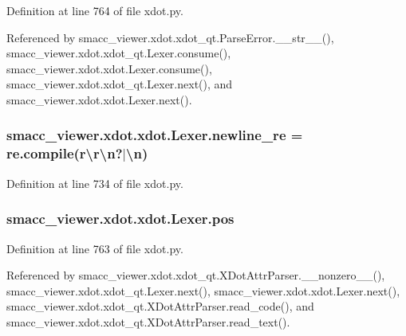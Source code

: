 Definition at line 764 of file xdot.\+py.



Referenced by smacc\+\_\+viewer.\+xdot.\+xdot\+\_\+qt.\+Parse\+Error.\+\_\+\+\_\+str\+\_\+\+\_\+(), smacc\+\_\+viewer.\+xdot.\+xdot\+\_\+qt.\+Lexer.\+consume(), smacc\+\_\+viewer.\+xdot.\+xdot.\+Lexer.\+consume(), smacc\+\_\+viewer.\+xdot.\+xdot\+\_\+qt.\+Lexer.\+next(), and smacc\+\_\+viewer.\+xdot.\+xdot.\+Lexer.\+next().

\subsubsection[{\texorpdfstring{newline\+\_\+re}{newline_re}}]{\setlength{\rightskip}{0pt plus 5cm}smacc\+\_\+viewer.\+xdot.\+xdot.\+Lexer.\+newline\+\_\+re = re.\+compile(r\textquotesingle{}\textbackslash{}r\textbackslash{}n?$\vert$\textbackslash{}n\textquotesingle{})\hspace{0.3cm}{\ttfamily [static]}}\hypertarget{classsmacc__viewer_1_1xdot_1_1xdot_1_1Lexer_af90a8038b30408f3e9cc7abc26235907}{}\label{classsmacc__viewer_1_1xdot_1_1xdot_1_1Lexer_af90a8038b30408f3e9cc7abc26235907}


Definition at line 734 of file xdot.\+py.

\subsubsection[{\texorpdfstring{pos}{pos}}]{\setlength{\rightskip}{0pt plus 5cm}smacc\+\_\+viewer.\+xdot.\+xdot.\+Lexer.\+pos}\hypertarget{classsmacc__viewer_1_1xdot_1_1xdot_1_1Lexer_a5748d2ef8e2cd8390bec0bd89621c2d6}{}\label{classsmacc__viewer_1_1xdot_1_1xdot_1_1Lexer_a5748d2ef8e2cd8390bec0bd89621c2d6}


Definition at line 763 of file xdot.\+py.



Referenced by smacc\+\_\+viewer.\+xdot.\+xdot\+\_\+qt.\+X\+Dot\+Attr\+Parser.\+\_\+\+\_\+nonzero\+\_\+\+\_\+(), smacc\+\_\+viewer.\+xdot.\+xdot\+\_\+qt.\+Lexer.\+next(), smacc\+\_\+viewer.\+xdot.\+xdot.\+Lexer.\+next(), smacc\+\_\+viewer.\+xdot.\+xdot\+\_\+qt.\+X\+Dot\+Attr\+Parser.\+read\+\_\+code(), and smacc\+\_\+viewer.\+xdot.\+xdot\+\_\+qt.\+X\+Dot\+Attr\+Parser.\+read\+\_\+text().

